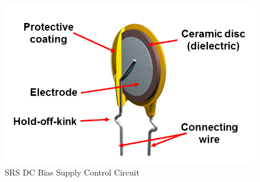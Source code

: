 \begin{figure}
\includegraphics[keepaspectratio=true,scale=.5]{./figures/testImage.png}
\centering
\caption{SRS DC Bias Supply Control Circuit}
\label{srsCtrl}
\end{figure}
